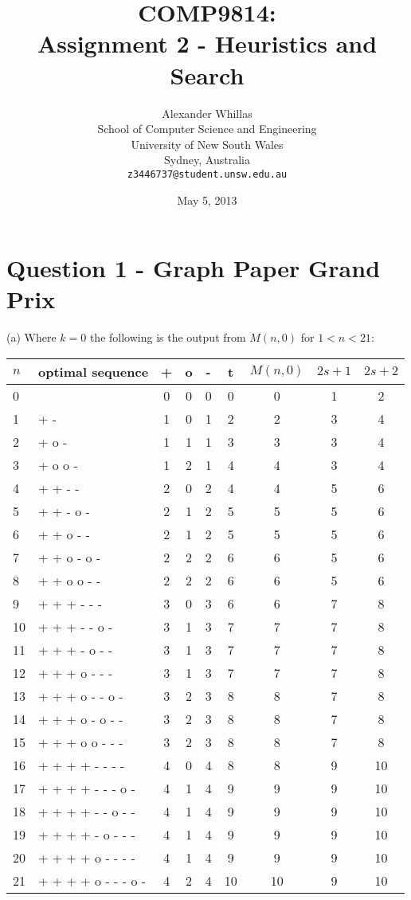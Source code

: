 \documentclass[a4paper,12pt]{article}
\title{COMP9814:\\Assignment 2 - Heuristics and Search}
\author{Alexander Whillas\\
\small School of Computer Science and Engineering\\[-0.8ex]
\small University of New South Wales\\[-0.8ex]
\small Sydney, Australia\\
\small \texttt{z3446737@student.unsw.edu.au}
}
\date{May 5, 2013}
\begin{document}
\maketitle
\newpage


\section*{Question 1 - Graph Paper Grand Prix}

(a) Where $k = 0$ the following is the output from $M(n, 0)$ for $1 < n < 21$:

\begin{center}
\begin{tabular}{llccccccc}
\hline
$n$ & optimal sequence & + & o & - & t & $M(n,0)$ & $2s + 1$ & $2s + 2$\\
\hline
0  &  & 0 & 0 & 0 & 0 & 0 & 1 & 2\\
1  & + - & 1 & 0 & 1 & 2 & 2 & 3 & 4\\
2  & + o - & 1 & 1 & 1 & 3 & 3 & 3 & 4\\
3  & + o o - & 1 & 2 & 1 & 4 & 4 & 3 & 4\\
4  & + + - - & 2 & 0 & 2 & 4 & 4 & 5 & 6\\
5  & + + - o - & 2 & 1 & 2 & 5 & 5 & 5 & 6\\
6  & + + o - - & 2 & 1 & 2 & 5 & 5 & 5 & 6\\
7  & + + o - o - & 2 & 2 & 2 & 6 & 6 & 5 & 6\\
8  & + + o o - - & 2 & 2 & 2 & 6 & 6 & 5 & 6\\
9  & + + + - - - & 3 & 0 & 3 & 6 & 6 & 7 & 8\\
10 & + + + - - o - & 3 & 1 & 3 & 7 & 7 & 7 & 8\\
11 & + + + - o - - & 3 & 1 & 3 & 7 & 7 & 7 & 8\\
12 & + + + o - - - & 3 & 1 & 3 & 7 & 7 & 7 & 8\\
13 & + + + o - - o - & 3 & 2 & 3 & 8 & 8 & 7 & 8\\
14 & + + + o - o - - & 3 & 2 & 3 & 8 & 8 & 7 & 8\\
15 & + + + o o - - - & 3 & 2 & 3 & 8 & 8 & 7 & 8\\
16 & + + + + - - - - & 4 & 0 & 4 & 8 & 8 & 9 & 10\\
17 & + + + + - - - o - & 4 & 1 & 4 & 9 & 9 & 9 & 10\\
18 & + + + + - - o - - & 4 & 1 & 4 & 9 & 9 & 9 & 10\\
19 & + + + + - o - - - & 4 & 1 & 4 & 9 & 9 & 9 & 10\\
20 & + + + + o - - - - & 4 & 1 & 4 & 9 & 9 & 9 & 10\\
21 & + + + + o - - - o - & 4 & 2 & 4 & 10 & 10 & 9 & 10\\
\hline
\end{tabular}
\end{center}
\end{document}

